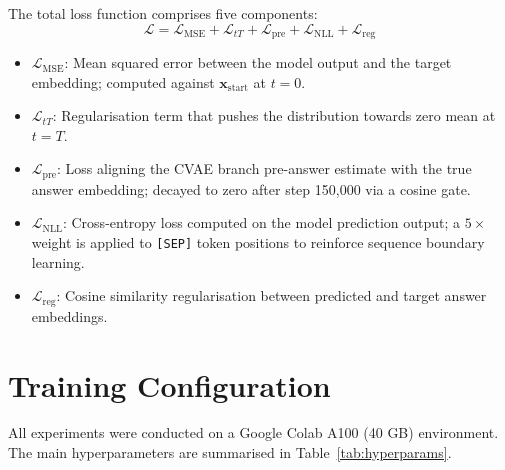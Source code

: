 \documentclass[9pt]{report}
\begin{document}
The total loss function comprises five components:
\begin{equation}
    \mathcal{L} = \mathcal{L}_{\text{MSE}} + \mathcal{L}_{tT} + \mathcal{L}_{\text{pre}} + \mathcal{L}_{\text{NLL}} + \mathcal{L}_{\text{reg}}
\end{equation}

\begin{itemize}
    \item $\mathcal{L}_{\text{MSE}}$: Mean squared error between the model output and the target embedding; computed against $\mathbf{x}_{\text{start}}$ at $t = 0$.
    \item $\mathcal{L}_{tT}$: Regularisation term that pushes the distribution towards zero mean at $t = T$.
    \item $\mathcal{L}_{\text{pre}}$: Loss aligning the CVAE branch pre-answer estimate with the true answer embedding; decayed to zero after step 150,000 via a cosine gate.
    \item $\mathcal{L}_{\text{NLL}}$: Cross-entropy loss computed on the model prediction output; a $5\times$ weight is applied to \texttt{[SEP]} token positions to reinforce sequence boundary learning.
    \item $\mathcal{L}_{\text{reg}}$: Cosine similarity regularisation between predicted and target answer embeddings.
\end{itemize}

\section{Training Configuration}

All experiments were conducted on a Google Colab A100 (40 GB) environment. The main hyperparameters are summarised in Table~\ref{tab:hyperparams}.
\end{document}
